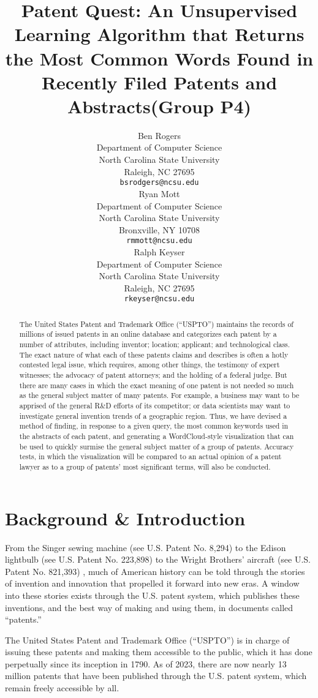 \documentclass{article}
\title{Patent Quest: An Unsupervised Learning Algorithm that Returns the Most Common Words Found in Recently Filed Patents and Abstracts\newline (Group P4)}
\author{%
  Ben Rogers\\
  Department of Computer Science\\
  North Carolina State University\\
  Raleigh, NC 27695 \\
  \texttt{bsrodgers@ncsu.edu} \\
  \And
  Ryan Mott \\
  Department of Computer Science \\
  North Carolina State University \\
  Bronxville, NY 10708 \\
  \texttt{rmmott@ncsu.edu} \\
  \And
  Ralph Keyser \\
  Department of Computer Science \\
  North Carolina State University \\
  Raleigh, NC 27695 \\
  \texttt{rkeyser@ncsu.edu} \\
}
\begin{document}
\maketitle

\begin{abstract}
 The United States Patent and Trademark Office (“USPTO”) maintains the records of millions of issued patents in an online database and categorizes each patent by a number of attributes, including inventor; location; applicant; and technological class.   The exact nature of what each of these patents claims and describes is often a hotly contested legal issue, which requires, among other things, the testimony of expert witnesses; the advocacy of patent attorneys; and the holding of a federal judge.  But there are many cases in which the exact meaning of one patent is not needed so much as the general subject matter of many patents.  For example, a business may want to be apprised of the general R\&D efforts of its competitor; or data scientists may want to investigate general invention trends of a geographic region.  Thus, we have devised a method of finding, in response to a given query, the most common keywords used in the abstracts of each patent, and generating a WordCloud-style visualization that can be used to quickly surmise the general subject matter of a group of patents.  Accuracy tests, in which the visualization will be compared to an actual opinion of a patent lawyer as to a group of patents’ most significant terms, will also be conducted.
\end{abstract}

\section{Background \& Introduction}
\label{background}

From the Singer sewing machine (see U.S. Patent No. 8,294) to the Edison lightbulb (see U.S. Patent No. 223,898) to the Wright Brothers’ aircraft (see U.S. Patent No. 821,393) , much of American history can be told through the stories of invention and innovation that propelled it forward into new eras.  A window into these stories exists through the U.S. patent system, which publishes these inventions, and the best way of making and using them, in documents called “patents.”  

The United States Patent and Trademark Office (“USPTO”) is in charge of issuing these patents and making them accessible to the public, which it has done perpetually since its inception in 1790.  As of 2023, there are now nearly 13 million patents that have been published through the U.S. patent system, which remain freely accessible by all. 
\end{document}
